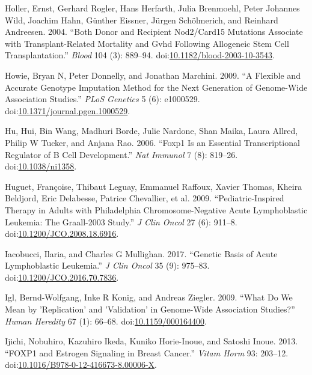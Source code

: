 \documentclass[]{DissertateOSU}
\begin{document}
\hypertarget{ref-holler_2004}{}
Holler, Ernst, Gerhard Rogler, Hans Herfarth, Julia Brenmoehl, Peter
Johannes Wild, Joachim Hahn, Günther Eissner, Jürgen Schölmerich, and
Reinhard Andreesen. 2004. ``Both Donor and Recipient Nod2/Card15
Mutations Associate with Transplant-Related Mortality and Gvhd Following
Allogeneic Stem Cell Transplantation.'' \emph{Blood} 104 (3): 889--94.
doi:\href{https://doi.org/10.1182/blood-2003-10-3543}{10.1182/blood-2003-10-3543}.

\hypertarget{ref-Howie_2009}{}
Howie, Bryan N, Peter Donnelly, and Jonathan Marchini. 2009. ``A
Flexible and Accurate Genotype Imputation Method for the Next Generation
of Genome-Wide Association Studies.'' \emph{PLoS Genetics} 5 (6):
e1000529.
doi:\href{https://doi.org/10.1371/journal.pgen.1000529}{10.1371/journal.pgen.1000529}.

\hypertarget{ref-hu_2006}{}
Hu, Hui, Bin Wang, Madhuri Borde, Julie Nardone, Shan Maika, Laura
Allred, Philip W Tucker, and Anjana Rao. 2006. ``Foxp1 Is an Essential
Transcriptional Regulator of B Cell Development.'' \emph{Nat Immunol} 7
(8): 819--26. doi:\href{https://doi.org/10.1038/ni1358}{10.1038/ni1358}.

\hypertarget{ref-Huguet_2009}{}
Huguet, Françoise, Thibaut Leguay, Emmanuel Raffoux, Xavier Thomas,
Kheira Beldjord, Eric Delabesse, Patrice Chevallier, et al. 2009.
``Pediatric-Inspired Therapy in Adults with Philadelphia
Chromosome-Negative Acute Lymphoblastic Leukemia: The Graall-2003
Study.'' \emph{J Clin Oncol} 27 (6): 911--8.
doi:\href{https://doi.org/10.1200/JCO.2008.18.6916}{10.1200/JCO.2008.18.6916}.

\hypertarget{ref-Iacobucci_2017}{}
Iacobucci, Ilaria, and Charles G Mullighan. 2017. ``Genetic Basis of
Acute Lymphoblastic Leukemia.'' \emph{J Clin Oncol} 35 (9): 975--83.
doi:\href{https://doi.org/10.1200/JCO.2016.70.7836}{10.1200/JCO.2016.70.7836}.

\hypertarget{ref-Igl_2009}{}
Igl, Bernd-Wolfgang, Inke R Konig, and Andreas Ziegler. 2009. ``What Do
We Mean by 'Replication' and 'Validation' in Genome-Wide Association
Studies?'' \emph{Human Heredity} 67 (1): 66--68.
doi:\href{https://doi.org/10.1159/000164400}{10.1159/000164400}.

\hypertarget{ref-Ijichi_2013}{}
Ijichi, Nobuhiro, Kazuhiro Ikeda, Kuniko Horie-Inoue, and Satoshi Inoue.
2013. ``FOXP1 and Estrogen Signaling in Breast Cancer.'' \emph{Vitam
Horm} 93: 203--12.
doi:\href{https://doi.org/10.1016/B978-0-12-416673-8.00006-X}{10.1016/B978-0-12-416673-8.00006-X}.
\end{document}
